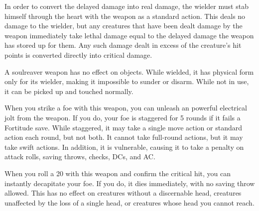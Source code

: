 In order to convert the delayed damage into real damage, the wielder must stab himself through the heart with the weapon as a standard action. This deals no damage to the wielder, but any creatures that have been dealt damage by the weapon immediately take lethal damage equal to the delayed damage the weapon has stored up for them. Any such damage dealt in excess of the creature's hit points is converted directly into critical damage.

A soulreaver weapon has no effect on objects. While wielded, it has physical form only for its wielder, making it impossible to sunder or disarm. While not in use, it can be picked up and touched normally.


 When you strike a foe with this weapon, you can unleash an powerful electrical jolt from the weapon. If you do, your foe is staggered for 5 rounds if it fails a Fortitude save. While staggered, it may take a single move action or standard action each round, but not both. It cannot take full-round actions, but it may take swift actions. In addition, it is vulnerable, causing it to take a  penalty on attack rolls, saving throws, checks, DCs, and AC.


 When you roll a 20 with this weapon and confirm the critical hit, you can instantly decapitate your foe. If you do, it dies immediately, with no saving throw allowed. This has no effect on creatures without a discernable head, creatures unaffected by the loss of a single head, or creatures whose head you cannot reach.


\begin{comment}
\subsection{Rods}

Rods are scepterlike devices that have unique magical powers and do not usually have charges. Anyone can use a rod.

\parhead{Physical Description} Rods weigh approximately 5 pounds.

They range from 2 feet to 3 feet long and are usually made of iron or some other metal. (Many, as noted in their descriptions, can function as light maces or clubs due to their sturdy construction.)

These sturdy items have AC 9, 10 hit points, hardness 10, and a break DC of 27.

\parhead{Activation} Details relating to rod use vary from item to item. See the individual descriptions for specifics.
\end{comment}

